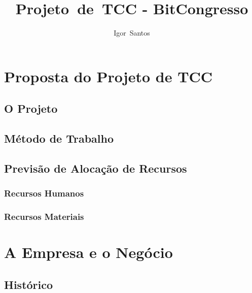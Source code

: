 \documentclass[a4paper]{abntex2}
\author{Igor~Santos}
\title{Projeto~de~TCC - BitCongresso}
\begin{document}
\maketitle


\tableofcontents

\chapter{Proposta do Projeto de TCC}

\section{O Projeto}


\section{Método de Trabalho}


\section{Previsão de Alocação de Recursos}

\subsection*{Recursos Humanos}

\subsection*{Recursos Materiais}


\chapter{A Empresa e o Negócio}


\section{Histórico}
\end{document}
